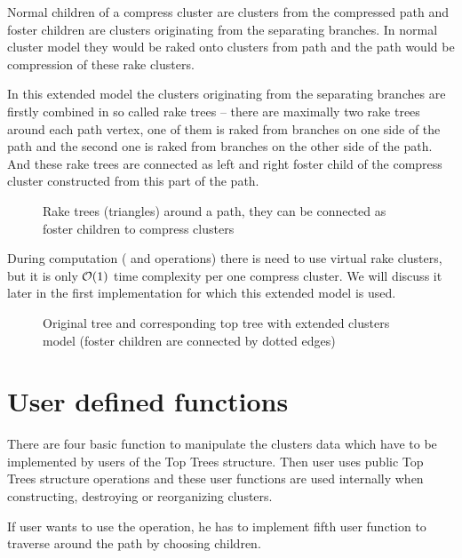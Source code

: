 Normal children of a compress cluster are clusters from the compressed path and
foster children are clusters originating from the separating branches. In normal
cluster model they would be raked onto clusters from path and the path would be
compression of these rake clusters.

In this extended model the clusters originating from the separating branches are
firstly combined in so called {\I rake trees} -- there are maximally two rake
trees around each path vertex, one of them is raked from branches on one side of
the path and the second one is raked from branches on the other side of the
path. And these rake trees are connected as left and right foster child of the
compress cluster constructed from this part of the path.

\begin{figure}[h]
\centering
{}
\caption[Rake trees around a path]
{Rake trees (triangles) around a path, they can be connected as foster children
to compress clusters}
\end{figure}

During computation (\Join{} and \Split{} operations) there is need to use
virtual rake clusters, but it is only ${\cal O}(1)$ time complexity per one compress
cluster. We will discuss it later in the first implementation for which this
extended model is used.

\begin{figure}[h]
\centering
{}
\caption[Original tree and corresponding top tree with extended clusters model]
{Original tree and corresponding top tree with extended clusters model
(foster children are connected by dotted edges)}
\end{figure}



\section{User defined functions}

There are four basic function to manipulate the clusters data which have to
be implemented by users of the Top Trees structure. Then user uses public Top
Trees structure operations and these user functions are used internally when
constructing, destroying or reorganizing clusters.

If user wants to use the \Search{} operation, he has to implement fifth user
function \Choose{} to traverse around the path by choosing children.

